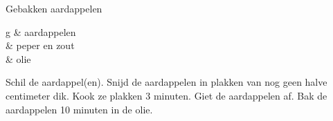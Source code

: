 \begin{recipe}
[ %
    preparationtime = {\unit[\nicefrac{1}{4}]{h}},
    bakingtime = {\unit[3]{min} koken, \unit[10]{min} bakken},
    portion = {\portion{1}},
    calory,
    source = {Steven Speek}
]
{Gebakken aardappelen}

    \ingredients
    {%
        \unit[200]{g} & aardappelen\\
	& peper en zout \\
	& olie \\
    }

    \preparation
    {%
        \step Schil de aardappel(en).
        \step Snijd de aardappelen in plakken van nog geen halve centimeter dik.
        \step Kook ze plakken 3 minuten.
        \step Giet de aardappelen af.
	\step Bak de aardappelen 10 minuten in de olie.
    }
    
\end{recipe}
